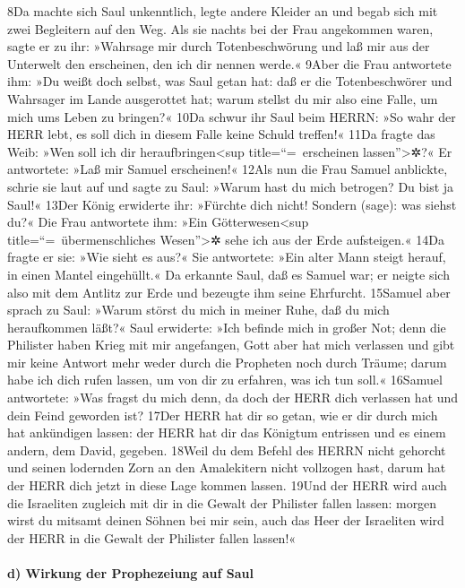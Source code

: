 8Da machte sich Saul unkenntlich, legte andere Kleider an und begab sich
mit zwei Begleitern auf den Weg. Als sie nachts bei der Frau angekommen
waren, sagte er zu ihr: »Wahrsage mir durch Totenbeschwörung und laß mir
aus der Unterwelt den erscheinen, den ich dir nennen werde.« 9Aber die
Frau antwortete ihm: »Du weißt doch selbst, was Saul getan hat: daß er
die Totenbeschwörer und Wahrsager im Lande ausgerottet hat; warum
stellst du mir also eine Falle, um mich ums Leben zu bringen?« 10Da
schwur ihr Saul beim HERRN: »So wahr der HERR lebt, es soll dich in
diesem Falle keine Schuld treffen!« 11Da fragte das Weib: »Wen soll ich
dir heraufbringen\textless sup title=``=~erscheinen
lassen''\textgreater✲?« Er antwortete: »Laß mir Samuel erscheinen!«
12Als nun die Frau Samuel anblickte, schrie sie laut auf und sagte zu
Saul: »Warum hast du mich betrogen? Du bist ja Saul!« 13Der König
erwiderte ihr: »Fürchte dich nicht! Sondern (sage): was siehst du?« Die
Frau antwortete ihm: »Ein Götterwesen\textless sup
title=``=~übermenschliches Wesen''\textgreater✲ sehe ich aus der Erde
aufsteigen.« 14Da fragte er sie: »Wie sieht es aus?« Sie antwortete:
»Ein alter Mann steigt herauf, in einen Mantel eingehüllt.« Da erkannte
Saul, daß es Samuel war; er neigte sich also mit dem Antlitz zur Erde
und bezeugte ihm seine Ehrfurcht. 15Samuel aber sprach zu Saul: »Warum
störst du mich in meiner Ruhe, daß du mich heraufkommen läßt?« Saul
erwiderte: »Ich befinde mich in großer Not; denn die Philister haben
Krieg mit mir angefangen, Gott aber hat mich verlassen und gibt mir
keine Antwort mehr weder durch die Propheten noch durch Träume; darum
habe ich dich rufen lassen, um von dir zu erfahren, was ich tun soll.«
16Samuel antwortete: »Was fragst du mich denn, da doch der HERR dich
verlassen hat und dein Feind geworden ist? 17Der HERR hat dir so getan,
wie er dir durch mich hat ankündigen lassen: der HERR hat dir das
Königtum entrissen und es einem andern, dem David, gegeben. 18Weil du
dem Befehl des HERRN nicht gehorcht und seinen lodernden Zorn an den
Amalekitern nicht vollzogen hast, darum hat der HERR dich jetzt in diese
Lage kommen lassen. 19Und der HERR wird auch die Israeliten zugleich mit
dir in die Gewalt der Philister fallen lassen: morgen wirst du mitsamt
deinen Söhnen bei mir sein, auch das Heer der Israeliten wird der HERR
in die Gewalt der Philister fallen lassen!«

\hypertarget{d-wirkung-der-prophezeiung-auf-saul}{%
\paragraph{d) Wirkung der Prophezeiung auf
Saul}\label{d-wirkung-der-prophezeiung-auf-saul}}

